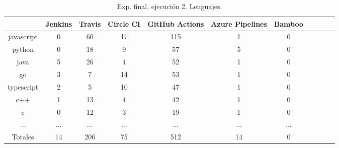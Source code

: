 \begin{table}
  \centering
  \caption{Exp. final, ejecución 2. Lenguajes.}
  \label{tab:tabla_f2_2a}

\begin{footnotesize}
\renewcommand{\arraystretch}{1.5} %
\begin{tabular}{ccccccccccc}
  \hline
  {} &  Jenkins &  Travis &  Circle CI &  GitHub Actions &  Azure Pipelines &  Bamboo \\
  \hline
  javascript    &        0 &      60 &         17 &             115 &                1 &       0 \\
  python        &        0 &      18 &          9 &              57 &                5 &       0 \\
  java          &        5 &      26 &          4 &              52 &                1 &       0 \\
  go            &        3 &       7 &         14 &              53 &                1 &       0 \\
  typescript    &        2 &       5 &         10 &              47 &                1 &       0 \\
  c++           &        1 &      13 &          4 &              42 &                1 &       0 \\
  c             &        0 &      12 &          3 &              19 &                1 &       0 \\
  ...           &      ... &     ... &        ... &             ... &              ... &     ... \\
  \hline
  Totales       &       14 &     206 &         75 &             512 &               14 &       0 \\
 \end{tabular}
\end{footnotesize}

\end{table}

